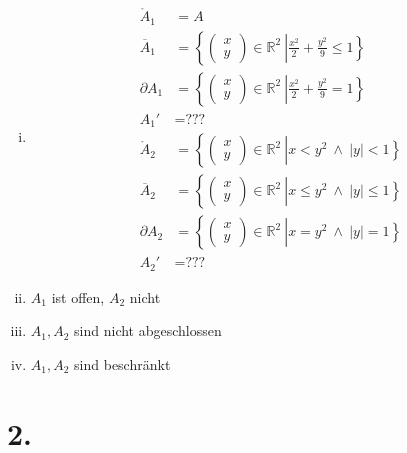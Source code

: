 \documentclass[11pt,a4paper]{article}
\newcommand {\Rzwei}	{\mathbb{R}^2}
\newcommand{\1}    	{\mathbbm{1}}
\begin{document}
	\begin{enumerate}[i.)]
		\item
		\begin{align*}
			\mathring{A}_1 &= A \\
			\overline{A}_1 &= \left\{ \left( \begin{array}{c} x \\ y\end{array} \right) \in \Rzwei ~\right\vert \left.
			\frac{x^2}{2} + \frac{y^2}{9} \leqslant 1 \right\} \\
			\partial A_1 &= \left\{ \left( \begin{array}{c} x \\ y\end{array} \right) \in \Rzwei ~\right\vert \left.
			\frac{x^2}{2} + \frac{y^2}{9} = 1 \right\} \\
			A_1' &= \textrm{???} \\
			\mathring{A}_2 &= \left\{ \left( \begin{array}{c} x \\ y\end{array} \right) \in \Rzwei ~\right\vert \left. x < y^2 ~\land~ \vert y \vert < 1 \right\} \\
			\overline{A}_2 &= \left\{ \left( \begin{array}{c} x \\ y\end{array} \right) \in \Rzwei ~\right\vert \left. x \leqslant y^2 ~\land~ \vert y \vert \leqslant 1 \right\} \\
			\partial A_2 &= \left\{ \left( \begin{array}{c} x \\ y\end{array} \right) \in \Rzwei ~\right\vert \left. x = y^2 ~\land~ \vert y \vert = 1 \right\} \\
			A_2' &= \textrm{???} 
		\end{align*}
		\item \(A_1\) ist offen, \(A_2\) nicht
		\item \(A_1, A_2\) sind nicht abgeschlossen
		\item \(A_1, A_2\) sind beschränkt
	\end{enumerate}
	
	\section*{2.}	
	
\end{document}
